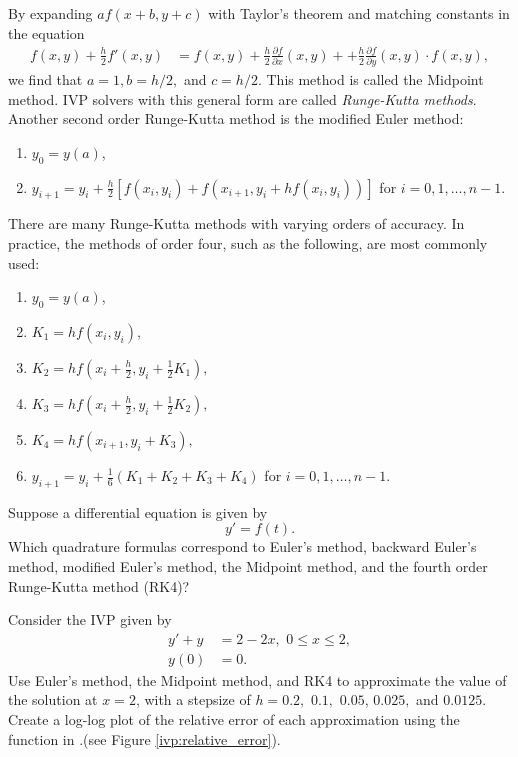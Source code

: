 By expanding $a f(x+b, y+c)$ with Taylor's theorem and matching constants in the equation
\begin{align*}
f(x,y) + \frac{h}{2}f'(x,y) &= f(x,y) + \frac{h}{2}\frac{\partial f}{\partial x}(x,y) +  + \frac{h}{2}\frac{\partial f}{\partial y}(x,y) \cdot f(x,y),
\end{align*}
we find that $a = 1, b = h/2,$ and $c = h/2$. This method is called the Midpoint method. IVP solvers with this general form are called \textit{Runge-Kutta methods}. Another second order Runge-Kutta method is the modified Euler method: 

\begin{enumerate}
\item $y_0 = y(a)$,
\item $y_{i+1} = y_i + \frac{h}{2}[ f(x_i, y_i) + f(x_{i+1}, y_i+ hf(x_i, y_i))]$ for $i = 0,1,\hdots, n-1.$
\end{enumerate}


There are many Runge-Kutta methods with varying orders of accuracy. In practice, the methods of order four, such as the following, are most commonly used: 
\begin{enumerate}
\item $y_0 = y(a)$, 
\item $K_1 = hf(x_i,y_i),$
\item $K_2 = hf(x_i + \frac{h}{2}, y_i + \frac{1}{2} K_1),$
\item $K_3 = hf(x_i + \frac{h}{2} , y_i + \frac{1}{2} K_2),$
\item $K_4 = hf(x_{i+1} , y_i +  K_3),$
\item $y_{i+1} = y_i + \frac{1}{6}(K_1 + K_2 + K_3 + K_4)$ for $i = 0,1,\hdots,n-1.$
\end{enumerate}


\begin{problem}
Suppose a differential equation is given by
\[ y' = f(t).\]
Which quadrature formulas correspond to Euler's method, backward Euler's method, modified Euler's method, the Midpoint method, and the fourth order Runge-Kutta method (RK4)? 
\end{problem}



\begin{problem} Consider the IVP given by 
\begin{align*}
y' + y &= 2-2x,\,\, 0 \leq x \leq 2, \\
y(0) &= 0.
\end{align*}
Use Euler's method, the Midpoint method, and RK4 to approximate the value of the solution at $x = 2$, with a stepsize of $h = 0.2,$ $ 0.1,$ $0.05 $, $0.025,$ and $0.0125.$ Create a log-log plot of the relative error of each approximation using the  function in .(see Figure \ref{ivp:relative_error}).
\end{problem}

